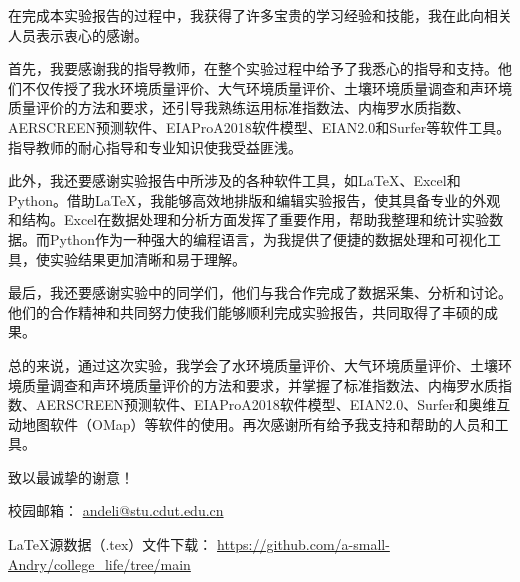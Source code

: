 \null   %

\begin{mythanks}

在完成本实验报告的过程中，我获得了许多宝贵的学习经验和技能，我在此向相关人员表示衷心的感谢。

首先，我要感谢我的指导教师，在整个实验过程中给予了我悉心的指导和支持。他们不仅传授了我水环境质量评价、大气环境质量评价、土壤环境质量调查和声环境质量评价的方法和要求，还引导我熟练运用标准指数法、内梅罗水质指数、AERSCREEN预测软件、EIAProA2018软件模型、EIAN2.0和Surfer等软件工具。指导教师的耐心指导和专业知识使我受益匪浅。

此外，我还要感谢实验报告中所涉及的各种软件工具，如\LaTeX、Excel和Python。借助\LaTeX，我能够高效地排版和编辑实验报告，使其具备专业的外观和结构。Excel在数据处理和分析方面发挥了重要作用，帮助我整理和统计实验数据。而Python作为一种强大的编程语言，为我提供了便捷的数据处理和可视化工具，使实验结果更加清晰和易于理解。

最后，我还要感谢实验中的同学们，他们与我合作完成了数据采集、分析和讨论。他们的合作精神和共同努力使我们能够顺利完成实验报告，共同取得了丰硕的成果。

总的来说，通过这次实验，我学会了水环境质量评价、大气环境质量评价、土壤环境质量调查和声环境质量评价的方法和要求，并掌握了标准指数法、内梅罗水质指数、AERSCREEN预测软件、EIAProA2018软件模型、EIAN2.0、Surfer和奥维互动地图软件（OMap）等软件的使用。再次感谢所有给予我支持和帮助的人员和工具。

致以最诚挚的谢意！

\vfill
\noindent\dotfill

\noindent 校园邮箱：
\href{mailto:andeli@stu.cdut.edu.cn}{andeli@stu.cdut.edu.cn}

\noindent \LaTeX 源数据（.tex）文件下载：
\href{https://github.com/a-small-Andry/college_life/tree/main/Environmental_Impact_Assessment_Experimental_Report}{https://github.com/a-small-Andry/college_life/tree/main}

\end{mythanks}

